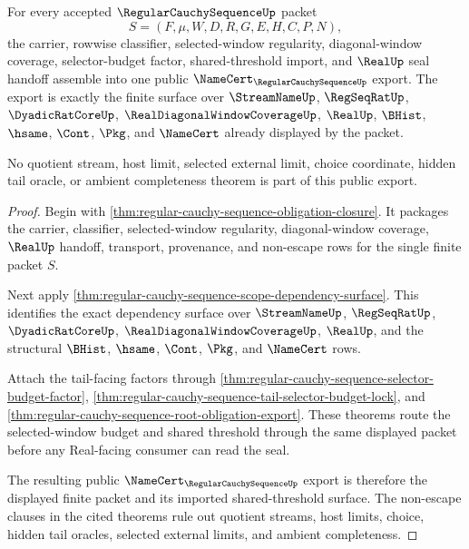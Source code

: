 \begin{theorem}
\label{thm:regular-cauchy-sequence-public-export}
For every accepted $\RegularCauchySequenceUp$ packet
$$
S=(F,\mu,W,D,R,G,E,H,C,P,N),
$$
the carrier, rowwise classifier, selected-window regularity, diagonal-window coverage, selector-budget factor, shared-threshold import, and $\RealUp$ seal handoff assemble into one public $\NameCert_{\RegularCauchySequenceUp}$ export. The export is exactly the finite surface over $\StreamNameUp$, $\RegSeqRatUp$, $\DyadicRatCoreUp$, $\RealDiagonalWindowCoverageUp$, $\RealUp$, $\BHist$, $\hsame$, $\Cont$, $\Pkg$, and $\NameCert$ already displayed by the packet.

No quotient stream, host limit, selected external limit, choice coordinate, hidden tail oracle, or ambient completeness theorem is part of this public export.
\end{theorem}
\begin{proof}
Begin with \autoref{thm:regular-cauchy-sequence-obligation-closure}. It packages the carrier, classifier, selected-window regularity, diagonal-window coverage, $\RealUp$ handoff, transport, provenance, and non-escape rows for the single finite packet $S$.

Next apply \autoref{thm:regular-cauchy-sequence-scope-dependency-surface}. This identifies the exact dependency surface over $\StreamNameUp$, $\RegSeqRatUp$, $\DyadicRatCoreUp$, $\RealDiagonalWindowCoverageUp$, $\RealUp$, and the structural $\BHist$, $\hsame$, $\Cont$, $\Pkg$, and $\NameCert$ rows.

Attach the tail-facing factors through \autoref{thm:regular-cauchy-sequence-selector-budget-factor}, \autoref{thm:regular-cauchy-sequence-tail-selector-budget-lock}, and \autoref{thm:regular-cauchy-sequence-root-obligation-export}. These theorems route the selected-window budget and shared threshold through the same displayed packet before any Real-facing consumer can read the seal.

The resulting public $\NameCert_{\RegularCauchySequenceUp}$ export is therefore the displayed finite packet and its imported shared-threshold surface. The non-escape clauses in the cited theorems rule out quotient streams, host limits, choice, hidden tail oracles, selected external limits, and ambient completeness.
\end{proof}


